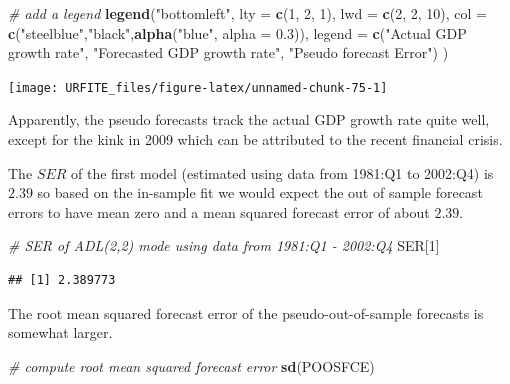 \documentclass[]{book}
\newenvironment{Shaded}{\begin{snugshade}}{\end{snugshade}}
\newcommand{\KeywordTok}[1]{\textcolor[rgb]{0.13,0.29,0.53}{\textbf{#1}}}
\newcommand{\DataTypeTok}[1]{\textcolor[rgb]{0.13,0.29,0.53}{#1}}
\newcommand{\DecValTok}[1]{\textcolor[rgb]{0.00,0.00,0.81}{#1}}
\newcommand{\FloatTok}[1]{\textcolor[rgb]{0.00,0.00,0.81}{#1}}
\newcommand{\StringTok}[1]{\textcolor[rgb]{0.31,0.60,0.02}{#1}}
\newcommand{\CommentTok}[1]{\textcolor[rgb]{0.56,0.35,0.01}{\textit{#1}}}
\newcommand{\NormalTok}[1]{#1}
\theoremstyle{definition}
\theoremstyle{definition}
\theoremstyle{definition}
\theoremstyle{remark}
\begin{document}
\begin{Shaded}
\begin{Highlighting}[]
\CommentTok{# add a legend}
\KeywordTok{legend}\NormalTok{(}\StringTok{"bottomleft"}\NormalTok{, }
       \DataTypeTok{lty =} \KeywordTok{c}\NormalTok{(}\DecValTok{1}\NormalTok{, }\DecValTok{2}\NormalTok{, }\DecValTok{1}\NormalTok{),}
       \DataTypeTok{lwd =} \KeywordTok{c}\NormalTok{(}\DecValTok{2}\NormalTok{, }\DecValTok{2}\NormalTok{, }\DecValTok{10}\NormalTok{),}
       \DataTypeTok{col =} \KeywordTok{c}\NormalTok{(}\StringTok{"steelblue"}\NormalTok{,}\StringTok{"black"}\NormalTok{,}\KeywordTok{alpha}\NormalTok{(}\StringTok{"blue"}\NormalTok{, }\DataTypeTok{alpha =} \FloatTok{0.3}\NormalTok{)), }
       \DataTypeTok{legend =} \KeywordTok{c}\NormalTok{(}\StringTok{"Actual GDP growth rate"}\NormalTok{,}
         \StringTok{"Forecasted GDP growth rate"}\NormalTok{,}
         \StringTok{"Pseudo forecast Error"}\NormalTok{)}
\NormalTok{       )}
\end{Highlighting}
\end{Shaded}

\begin{center}\texttt{[image: URFITE\_files/figure-latex/unnamed-chunk-75-1]} \end{center}

Apparently, the pseudo forecasts track the actual GDP growth rate quite
well, except for the kink in 2009 which can be attributed to the recent
financial crisis.

The \(SER\) of the first model (estimated using data from 1981:Q1 to
2002:Q4) is \(2.39\) so based on the in-sample fit we would expect the
out of sample forecast errors to have mean zero and a mean squared
forecast error of about \(2.39\).

\begin{Shaded}
\begin{Highlighting}[]
\CommentTok{# SER of ADL(2,2) mode using data from 1981:Q1 - 2002:Q4}
\NormalTok{SER[}\DecValTok{1}\NormalTok{]}
\end{Highlighting}
\end{Shaded}

\begin{verbatim}
## [1] 2.389773
\end{verbatim}

The root mean squared forecast error of the pseudo-out-of-sample
forecasts is somewhat larger.

\begin{Shaded}
\begin{Highlighting}[]
\CommentTok{# compute root mean squared forecast error}
\KeywordTok{sd}\NormalTok{(POOSFCE)}
\end{Highlighting}
\end{Shaded}
\end{document}
